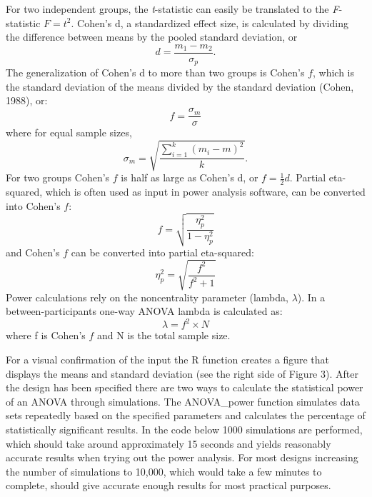 \documentclass[
  english,
  ,jou,floatsintext]{apa6}
\begin{document}
\begin{tcolorbox}[colback=black!5!white,colframe=white!5!black,title=Box 1. Formula for effect sizes for ANOVA designs]
For two independent groups, the \textit{t}-statistic can easily be translated to the \textit{F}-statistic $F = t^2$.
Cohen's d, a standardized effect size, is calculated by dividing the difference between means by the pooled standard deviation, or 
\begin{equation}
d = \frac{m_1-m_2}{\sigma_{ p }}.
\end{equation}
The generalization of Cohen's d to more than two groups is Cohen's $f$, which is the standard deviation of the means divided by the standard deviation (Cohen, 1988), or: 
\begin{equation}
f = \frac{\sigma _{ m }}{\sigma}
\end{equation}
where for equal sample sizes,
\begin{equation}
\sigma _{ m } = \sqrt { \frac { \sum_ { i = 1 } ^ { k } ( m _ { i } - m ) ^ { 2 } } { k } }.
\end{equation}
For two groups Cohen's $f$ is half as large as Cohen's d, or $f = \frac{1}{2}d$.
Partial eta-squared, which is often used as input in power analysis software, can be converted into Cohen's $f$:
\begin{equation}
f = \sqrt{\frac{\eta_p^2}{1-\eta_p^2}} \label{eq:eta-to-f}
\end{equation}
and Cohen's $f$ can be converted into partial eta-squared:
\begin{equation}
\eta_p^2 = \sqrt{\frac{f^2}{f^2+1}} \label{eq:f-to-eta}
\end{equation}
Power calculations rely on the noncentrality parameter (lambda, $\lambda$).
In a between-participants one-way ANOVA lambda is calculated as:
\begin{equation}
\lambda = f^2 \times N \label{eq:lambda}
\end{equation}
where f is Cohen's $f$ and N is the total sample size. 
\end{tcolorbox}

For a visual confirmation of the input the R function creates a figure that displays the means and standard deviation (see the right side of Figure 3).
After the design has been specified there are two ways to calculate the statistical power of an ANOVA through simulations.
The ANOVA\_power function simulates data sets repeatedly based on the specified parameters and calculates the percentage of statistically significant results.
In the code below 1000 simulations are performed, which should take around approximately 15 seconds and yields reasonably accurate results when trying out the power analysis.
For most designs increasing the number of simulations to 10,000, which would take a few minutes to complete, should give accurate enough results for most practical purposes.
\end{document}
